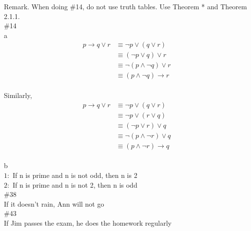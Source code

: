 \documentclass{article}
\begin{document}
Remark. When doing \#14, do not use truth tables. Use Theorem * and Theorem 2.1.1.\\
\#14\\
a
\begin{align}
   p \rightarrow q \vee r &\equiv  \neg p \vee (q \vee r)\\
   &\equiv (\neg p \vee q) \vee r\\
   &\equiv \neg(p \wedge \neg q) \vee r\\
   &\equiv (p \wedge \neg q) \rightarrow r
\end{align}\\
Similarly,
\begin{align}
   p \rightarrow q \vee r &\equiv  \neg p \vee (q \vee r)\\
   &\equiv \neg p \vee (r \vee q)\\
   &\equiv (\neg p \vee r) \vee q\\ 
   &\equiv \neg(p \wedge \neg r) \vee q\\
   &\equiv (p \wedge \neg r) \rightarrow q
\end{align}\\
b\\
$1: $ If n is prime and n is not odd, then n is 2\\
$2: $ If n is prime and n is not 2, then n is odd\\
\#38\\
If it doesn't rain, Ann will not go\\
\#43\\
If Jim passes the exam, he does the homework regularly
\end{document}
